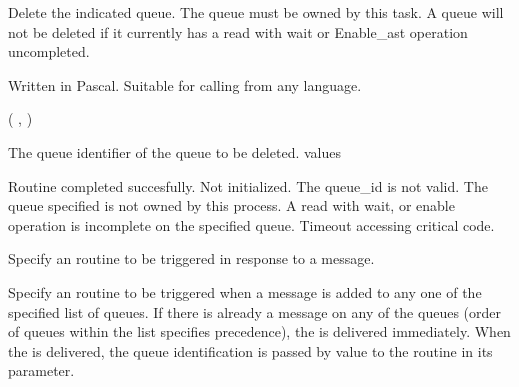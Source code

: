\begin{appendix}
\begin{manroutinedescription}
      Delete the indicated queue. The queue must be owned by
      this task. A queue will not be deleted if it currently
      has a read with wait or Enable\_ast operation uncompleted.

      Written in Pascal. Suitable for calling from any language.

      {} {\mantt{=}} {} ( {}, {} )

\begin{manparametertable}
                          The queue identifier of the queue to be
                          deleted.
      {} values
\end{manparametertable}
\begin{mantwocolumntable}
  Routine completed succesfully.
  {} Not initialized.
  The queue\_id is not valid.
  The queue specified is not owned
                           by this process.
  A read with wait, or enable {%
} operation
                             is incomplete on the specified queue.
  Timeout accessing critical code.
\end{mantwocolumntable}
\end{manroutinedescription}
\begin{manroutinedescription}
      Specify an {} routine to be triggered in response to a message.

      Specify an {} routine to be triggered when a message
      is added to any one of the specified list of queues.
      If there is already a message on any of the queues
      (order of queues within the list specifies precedence),
      the {} is delivered immediately. When the {} is %
delivered,
      the queue identification is passed by value to the {}
      routine in its parameter.


\end{manroutinedescription}
\end{appendix}
